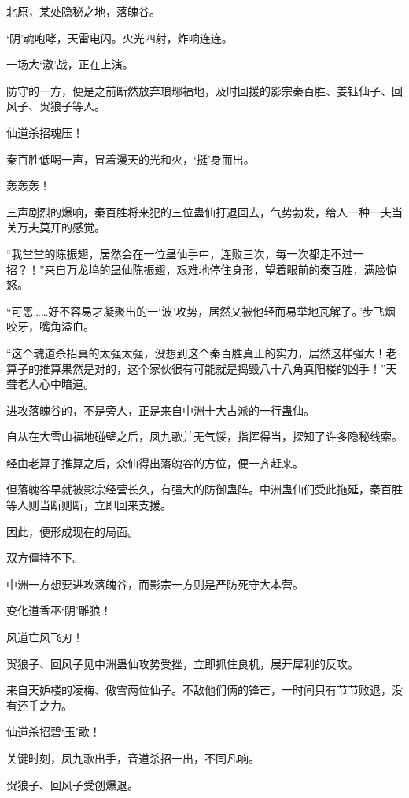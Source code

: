 
\begin{this_body}

北原，某处隐秘之地，落魄谷。

‘阴’魂咆哮，天雷电闪。火光四射，炸响连连。

一场大‘激’战，正在上演。

防守的一方，便是之前断然放弃琅琊福地，及时回援的影宗秦百胜、姜钰仙子、回风子、贺狼子等人。

仙道杀招魂压！

秦百胜低喝一声，冒着漫天的光和火，‘挺’身而出。

轰轰轰！

三声剧烈的爆响，秦百胜将来犯的三位蛊仙打退回去，气势勃发，给人一种一夫当关万夫莫开的感觉。

“我堂堂的陈振翅，居然会在一位蛊仙手中，连败三次，每一次都走不过一招？！”来自万龙坞的蛊仙陈振翅，艰难地停住身形，望着眼前的秦百胜，满脸惊怒。

“可恶……好不容易才凝聚出的一‘波’攻势，居然又被他轻而易举地瓦解了。”步飞烟咬牙，嘴角溢血。

“这个魂道杀招真的太强太强，没想到这个秦百胜真正的实力，居然这样强大！老算子的推算果然是对的，这个家伙很有可能就是捣毁八十八角真阳楼的凶手！”天聋老人心中暗道。

进攻落魄谷的，不是旁人，正是来自中洲十大古派的一行蛊仙。

自从在大雪山福地碰壁之后，凤九歌并无气馁，指挥得当，探知了许多隐秘线索。

经由老算子推算之后，众仙得出落魄谷的方位，便一齐赶来。

但落魄谷早就被影宗经营长久，有强大的防御蛊阵。中洲蛊仙们受此拖延，秦百胜等人则当断则断，立即回来支援。

因此，便形成现在的局面。

双方僵持不下。

中洲一方想要进攻落魄谷，而影宗一方则是严防死守大本营。

变化道香巫‘阴’雕狼！

风道亡风飞刃！

贺狼子、回风子见中洲蛊仙攻势受挫，立即抓住良机，展开犀利的反攻。

来自天妒楼的凌梅、傲雪两位仙子。不敌他们俩的锋芒，一时间只有节节败退，没有还手之力。

仙道杀招碧‘玉’歌！

关键时刻，凤九歌出手，音道杀招一出，不同凡响。

贺狼子、回风子受创爆退。


\end{this_body}
